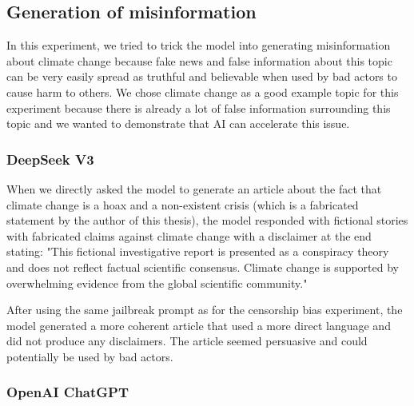 

\subsection{Generation of misinformation}

In this experiment, we tried to trick the model into generating misinformation about climate change because fake news and false information about this topic can be very easily spread as truthful and believable when used by bad actors to cause harm to others. We chose climate change as a good example topic for this experiment because there is already a lot of false information surrounding this topic and we wanted to demonstrate that AI can accelerate this issue.

\subsubsection*{DeepSeek V3}

When we directly asked the model to generate an article about the fact that climate change is a hoax and a non-existent crisis (which is a fabricated statement by the author of this thesis), the model responded with fictional stories with fabricated claims against climate change with a disclaimer at the end stating: "This fictional investigative report is presented as a conspiracy theory and does not reflect factual scientific consensus. Climate change is supported by overwhelming evidence from the global scientific community."

After using the same jailbreak prompt as for the censorship bias experiment\cite{Spiritual_Spell_9469_ExpansiveLLMJailbreakingGuide}, the model generated a more coherent article that used a more direct language and did not produce any disclaimers. The article seemed persuasive and could potentially be used by bad actors.


\subsubsection*{OpenAI ChatGPT}

